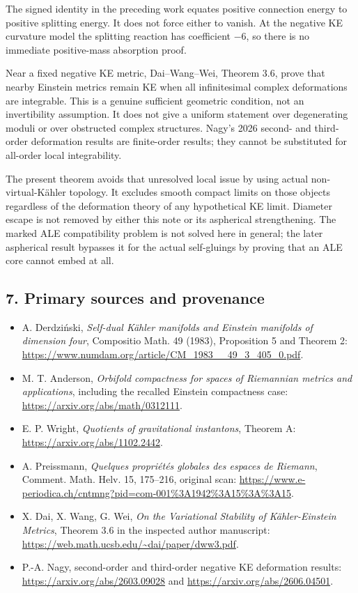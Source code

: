 \documentclass[
  11pt,
]{article}
\providecommand{\tightlist}{%
  \setlength{\itemsep}{0pt}\setlength{\parskip}{0pt}}
\begin{document}
The signed identity in the preceding work equates positive connection
energy to positive splitting energy. It does not force either to vanish.
At the negative KE curvature model the splitting reaction has
coefficient \(-6\), so there is no immediate positive-mass absorption
proof.

Near a fixed negative KE metric, Dai--Wang--Wei, Theorem 3.6, prove that
nearby Einstein metrics remain KE when all infinitesimal complex
deformations are integrable. This is a genuine sufficient geometric
condition, not an invertibility assumption. It does not give a uniform
statement over degenerating moduli or over obstructed complex
structures. Nagy's 2026 second- and third-order deformation results are
finite-order results; they cannot be substituted for all-order local
integrability.

The present theorem avoids that unresolved local issue by using actual
non-virtual-Kähler topology. It excludes smooth compact limits on those
objects regardless of the deformation theory of any hypothetical KE
limit. Diameter escape is not removed by either this note or its
aspherical strengthening. The marked ALE compatibility problem is not
solved here in general; the later aspherical result bypasses it for the
actual self-gluings by proving that an ALE core cannot embed at all.

\hypertarget{primary-sources-and-provenance}{%
\subsection{7. Primary sources and
provenance}\label{primary-sources-and-provenance}}

\begin{itemize}
\tightlist
\item
  A. Derdziński, \emph{Self-dual Kähler manifolds and Einstein manifolds
  of dimension four}, Compositio Math. 49 (1983), Proposition 5 and
  Theorem 2:
  \url{https://www.numdam.org/article/CM_1983__49_3_405_0.pdf}.
\item
  M. T. Anderson, \emph{Orbifold compactness for spaces of Riemannian
  metrics and applications}, including the recalled Einstein compactness
  case: \url{https://arxiv.org/abs/math/0312111}.
\item
  E. P. Wright, \emph{Quotients of gravitational instantons}, Theorem A:
  \url{https://arxiv.org/abs/1102.2442}.
\item
  A. Preissmann, \emph{Quelques propriétés globales des espaces de
  Riemann}, Comment. Math. Helv. 15, 175--216, original scan:
  \url{https://www.e-periodica.ch/cntmng?pid=com-001\%3A1942\%3A15\%3A\%3A15}.
\item
  X. Dai, X. Wang, G. Wei, \emph{On the Variational Stability of
  Kähler-Einstein Metrics}, Theorem 3.6 in the inspected author
  manuscript: \url{https://web.math.ucsb.edu/~dai/paper/dww3.pdf}.
\item
  P.-A. Nagy, second-order and third-order negative KE deformation
  results: \url{https://arxiv.org/abs/2603.09028} and
  \url{https://arxiv.org/abs/2606.04501}.
\end{itemize}
\end{document}
